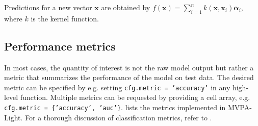 \documentclass[utf8]{frontiersSCNS} %
\newcommand{\al}{\boldsymbol{\alpha}}
\newcommand{\x}{\mathbf{x}}
\newcommand{\ttt}[1]{\texttt{#1}}
\begin{document}
Predictions for a new vector $\x$ are obtained by $f(\x) = \sum_{i=1}^n k(\x, \x_i)\al_i$, where $k$ is the kernel function.


\subsection{Performance metrics}\label{sec:metrics}

In most cases, the quantity of interest is not the raw model output but rather a metric that summarizes the performance of the model on test data. The desired metric can be specified by e.g. setting \ttt{cfg.metric = 'accuracy'} in any high-level function. Multiple metrics can be requested by providing a cell array, e.g. \ttt{cfg.metric = \{'accuracy', 'auc'\}}.  lists the metrics implemented in MVPA-Light. For a thorough discussion of classification metrics, refer to  \cite{Sokolova2009ATasks}.
\end{document}
